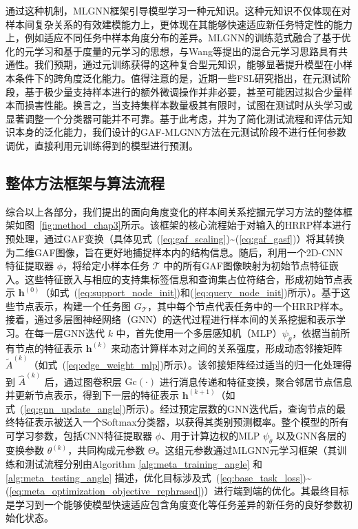 通过这种机制，MLGNN框架引导模型学习一种元知识。这种元知识不仅体现在对样本间复杂关系的有效建模能力上，更体现在其能够快速适应新任务特定性的能力上，例如适应不同任务中样本角度分布的差异。MLGNN的训练范式融合了基于优化的元学习和基于度量的元学习的思想，与Wang等提出的混合元学习思路具有共通性。我们预期，通过元训练获得的这种复合型元知识，能够显著提升模型在小样本条件下的跨角度泛化能力。值得注意的是，近期一些FSL研究指出，在元测试阶段，基于极少量支持样本进行的额外微调操作并非必要，甚至可能因过拟合少量样本而损害性能。换言之，当支持集样本数量极其有限时，试图在测试时从头学习或显著调整一个分类器可能并不可靠。基于此考虑，并为了简化测试流程和评估元知识本身的泛化能力，我们设计的GAF-MLGNN方法在元测试阶段不进行任何参数调优，直接利用元训练得到的模型进行预测。

\subsection{整体方法框架与算法流程}
\label{subsec:overall_framework_angle}

综合以上各部分，我们提出的面向角度变化的样本间关系挖掘元学习方法的整体框架如图~\ref{fig:method_chap3}所示。该框架的核心流程始于对输入的HRRP样本进行预处理，通过GAF变换（具体见式~(\ref{eq:gaf_scaling})\textasciitilde(\ref{eq:gaf_gasf})）将其转换为二维GAF图像，旨在更好地捕捉样本内的结构信息。随后，利用一个2D-CNN特征提取器 $\phi$，将给定小样本任务 $\mathcal{T}$ 中的所有GAF图像映射为初始节点特征嵌入。这些特征嵌入与相应的支持集标签信息和查询集占位符结合，形成初始节点表示 $\mathbf{h}^{(0)}$（如式~(\ref{eq:support_node_init})和(\ref{eq:query_node_init})所示）。基于这些节点表示，构建一个任务图 $G_{\mathcal{T}}$，其中每个节点代表任务中的一个HRRP样本。接着，通过多层图神经网络（GNN）的迭代过程进行样本间的关系挖掘和表示学习。在每一层GNN迭代 $k$ 中，首先使用一个多层感知机（MLP）$\psi_{\tilde{\theta}}$，依据当前所有节点的特征表示 $\mathbf{h}^{(k)}$ 来动态计算样本对之间的关系强度，形成动态邻接矩阵 $\tilde{A}^{(k)}$（如式~(\ref{eq:edge_weight_mlp})所示）。该邻接矩阵经过适当的归一化处理得到 $\hat{A}^{(k)}$ 后，通过图卷积层 $\mathrm{Gc}(\cdot)$ 进行消息传递和特征变换，聚合邻居节点信息并更新节点表示，得到下一层的特征表示 $\mathbf{h}^{(k+1)}$（如式~(\ref{eq:gnn_update_angle})所示）。经过预定层数的GNN迭代后，查询节点的最终特征表示被送入一个Softmax分类器，以获得其类别预测概率。整个模型的所有可学习参数，包括CNN特征提取器 $\phi$、用于计算边权的MLP $\psi_{\tilde{\theta}}$ 以及GNN各层的变换参数 $\theta^{(k)}$，共同构成元参数 $\Theta$。这组元参数通过MLGNN元学习框架（其训练和测试流程分别由Algorithm \ref{alg:meta_training_angle} 和 \ref{alg:meta_testing_angle} 描述，优化目标涉及式~(\ref{eq:base_task_loss})\textasciitilde(\ref{eq:meta_optimization_objective_rephrased})）进行端到端的优化。其最终目标是学习到一个能够使模型快速适应包含角度变化等任务差异的新任务的良好参数初始化状态。

